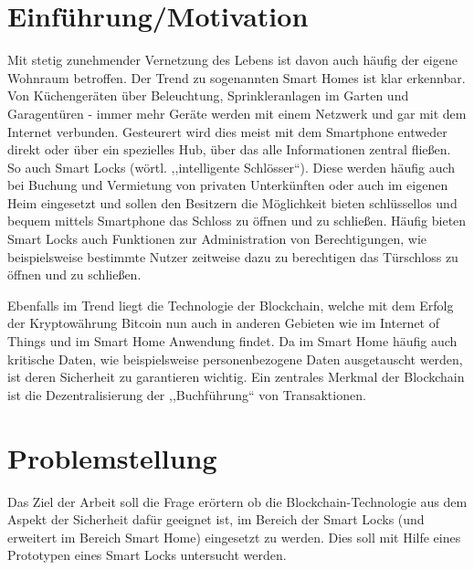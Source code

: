 \section*{Einführung/Motivation}
    
    Mit stetig zunehmender Vernetzung des Lebens ist davon auch häufig der eigene Wohnraum betroffen. 
    Der Trend zu sogenannten Smart Homes ist klar erkennbar. 
    Von Küchengeräten über Beleuchtung, Sprinkleranlagen im Garten und Ga\-ra\-gen\-tü\-ren - immer mehr Geräte werden mit einem Netzwerk und gar mit dem Internet verbunden. 
    Gesteurert wird dies meist mit dem Smartphone entweder direkt oder über ein spezielles Hub, über das alle Informationen zentral fließen.
    So auch Smart Locks (wörtl. ,,intelligente Schlösser``).
    Diese werden häufig auch bei Buchung und Vermietung von privaten Unterkünften oder auch im eigenen Heim eingesetzt und sollen den Besitzern die Möglichkeit bieten schlüssellos und bequem mittels Smartphone das Schloss zu öffnen und zu schließen.
    Häufig bieten Smart Locks auch Funktionen zur Administration von Berechtigungen, wie beispielsweise bestimmte Nutzer zeitweise dazu zu berechtigen das Türschloss zu öffnen und zu schließen. 
    
    Ebenfalls im Trend liegt die Technologie der Blockchain, welche mit dem Erfolg der Kryptowährung Bitcoin nun auch in anderen Gebieten wie im Internet of Things und im Smart Home Anwendung findet.
    Da im Smart Home häufig auch kritische Daten, wie beispielsweise personenbezogene Daten ausgetauscht werden, ist deren Sicherheit zu garantieren wichtig.
    Ein zentrales Merkmal der Blockchain ist die Dezentralisierung der ,,Buchführung`` von Transaktionen.

\section*{Problemstellung}
    Das Ziel der Arbeit soll die Frage erörtern ob die Block\-chain\--Tech\-no\-lo\-gie aus dem Aspekt der Sicherheit dafür geeignet ist, im Bereich der Smart Locks (und erweitert im Bereich Smart Home) eingesetzt zu werden.
    Dies soll mit Hilfe eines Prototypen eines Smart Locks untersucht werden.
    
